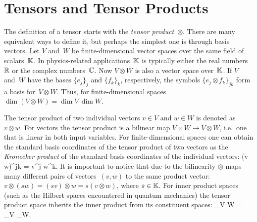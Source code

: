 \section{Tensors and Tensor Products}
\label{app:tensor}

The definition of a tensor starts with the \emph{tensor product}~$\otimes$.
There are many equivalent ways to define it, but perhaps the simplest one is
through basis vectors.
Let $V$ and~$W$ be finite-dimensional vector spaces over the same field of scalars~${\mathbb K}$.
In physics-related applications~${\mathbb K}$ is typically either the real numbers~${\mathbb R}$
or the complex numbers~${\mathbb C}$.
Now $V \otimes W$ is also a vector space over~${\mathbb K}$.
If $V$ and~$W$ have the bases
$\{e_j\}_j$ and $\{f_k\}_k$, respectively,
the symbols $\{e_j \otimes f_k\}_{jk}$ form a basis for~$V \otimes W$.
Thus, for finite-dimensional spaces
$\dim(V \otimes W) = \dim V \, \dim W$.

The tensor product of two individual vectors $v \in V$ and $w \in W$
is denoted as $v \otimes w$.
For vectors the tensor product is a bilinear map
$V \times W \to V \otimes W$,
i.e.~one that is linear in both input variables.
For finite-dimensional spaces
one can obtain the standard basis coordinates of the tensor product of two vectors
as the \emph{Kronecker product} of the standard basis coordinates of the individual vectors:
\be
(v \otimes w)^{jk} = v^j w^k.
\ee
It is important to notice that due to the bilinearity $\otimes$ maps
many different pairs of vectors~$(v,w)$ to the same product vector:
$v \otimes (s w) = (s v) \otimes w = s (v \otimes w)$, where $s \in {\mathbb K}$.
For inner product spaces (such as the Hilbert spaces encountered in
quantum mechanics) the tensor product space inherits the inner product
from its constituent spaces:
\be
{}_{V \otimes W} = _V _W.
\ee

